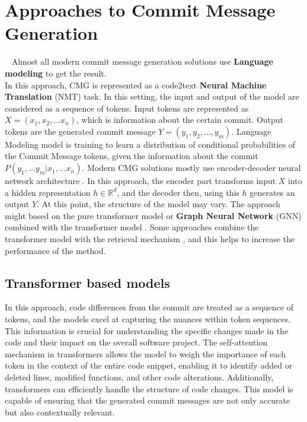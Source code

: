 \section{Approaches to Commit Message Generation}~\label{sec:CMG_approaches}
Almost all modern commit message generation solutions use \textbf{Language modeling} to get the result.\\
In this approach, CMG is represented as a code2text \textbf{Neural Machine Translation} (NMT) task. In this setting, the input and output of the model are considered as a sequence of tokens. Input tokens are represented as $X = (x_1, x_2, \dots x_n)$, which is information about the certain commit. Output tokens are the generated commit message $Y = (y_1, y_2, \dots, y_m)$. Language Modeling model is training to learn a distribution of conditional probabilities of the Commit Message tokens, given the information about the commit $P(y_1,\dots y_m | x_1, \dots x_n)$. 
Modern CMG solutions mostly use encoder-decoder neural network architecture{ }\cite{eliseeva2023commit,liu2020atom,liu2022commitbart,jung2021commitbert}. In this approach, the encoder part transforms input $X$ into a hidden representation $h \in \mathbb{R}^{d}$, and the decoder then, using this $h$ generates an output $Y$. At this point, the structure of the model may vary. The approach might based on the pure transformer model{ }\cite{jung2021commitbert,liu2022commitbart} or \textbf{Graph Neural Network} (GNN) combined with the transformer model{ }\cite{dong2022fira}. Some approaches combine the transformer model with the retrieval mechanism{ }\cite{shi2022race}, and this helps to increase the performance of the method.

\subsection{Transformer based models}\label{sec:transformers_for_cmg}
In this approach, code differences from the commit are treated as a sequence of tokens, and the models excel at capturing the nuances within token sequences. This information is crucial for understanding the specific changes made in the code and their impact on the overall software project. The self-attention mechanism in transformers allows the model to weigh the importance of each token in the context of the entire code snippet, enabling it to identify added or deleted lines, modified functions, and other code alterations. Additionally, transformers can efficiently handle the structure of code changes. This model is capable of ensuring that the generated commit messages are not only accurate but also contextually relevant. 

